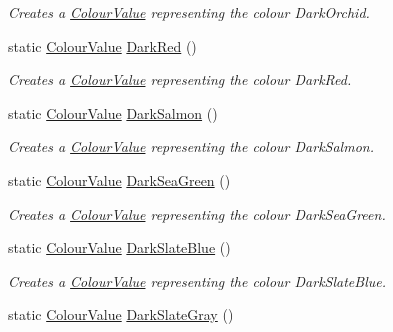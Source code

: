 \begin{DoxyCompactItemize}
\begin{DoxyCompactList}\small\item\em Creates a \hyperlink{classMezzanine_1_1ColourValue}{ColourValue} representing the colour DarkOrchid. \item\end{DoxyCompactList}\item 
static \hyperlink{classMezzanine_1_1ColourValue}{ColourValue} \hyperlink{classMezzanine_1_1ColourValue_aa4a9657545988fd861ab06b250f245b5}{DarkRed} ()
\begin{DoxyCompactList}\small\item\em Creates a \hyperlink{classMezzanine_1_1ColourValue}{ColourValue} representing the colour DarkRed. \item\end{DoxyCompactList}\item 
static \hyperlink{classMezzanine_1_1ColourValue}{ColourValue} \hyperlink{classMezzanine_1_1ColourValue_a1adc88528f8c910a95ccf10dbcf54f19}{DarkSalmon} ()
\begin{DoxyCompactList}\small\item\em Creates a \hyperlink{classMezzanine_1_1ColourValue}{ColourValue} representing the colour DarkSalmon. \item\end{DoxyCompactList}\item 
static \hyperlink{classMezzanine_1_1ColourValue}{ColourValue} \hyperlink{classMezzanine_1_1ColourValue_ab19c3e9810a27bbac4ae6d10b722f8c4}{DarkSeaGreen} ()
\begin{DoxyCompactList}\small\item\em Creates a \hyperlink{classMezzanine_1_1ColourValue}{ColourValue} representing the colour DarkSeaGreen. \item\end{DoxyCompactList}\item 
static \hyperlink{classMezzanine_1_1ColourValue}{ColourValue} \hyperlink{classMezzanine_1_1ColourValue_a1701c966143c8f8844687ebfdbfbd444}{DarkSlateBlue} ()
\begin{DoxyCompactList}\small\item\em Creates a \hyperlink{classMezzanine_1_1ColourValue}{ColourValue} representing the colour DarkSlateBlue. \item\end{DoxyCompactList}\item 
static \hyperlink{classMezzanine_1_1ColourValue}{ColourValue} \hyperlink{classMezzanine_1_1ColourValue_acf9700051c88ec81bfc17dc7c56861e9}{DarkSlateGray} ()

\end{DoxyCompactItemize}
